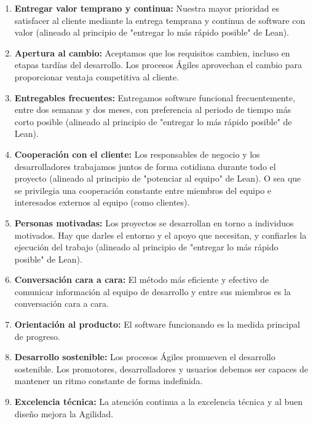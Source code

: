 \begin{enumerate}

\item \textbf{Entregar valor temprano y continua:} Nuestra mayor prioridad es satisfacer al cliente mediante la entrega temprana y continua de software con valor (alineado al principio de "entregar lo más rápido posible" de Lean).

\item \textbf{Apertura al cambio:} Aceptamos que los requisitos cambien, incluso en etapas tardías del desarrollo. Los procesos Ágiles aprovechan el cambio para proporcionar ventaja competitiva al cliente.

\item \textbf{Entregables frecuentes:} Entregamos software funcional frecuentemente, entre dos semanas y dos meses, con preferencia al periodo de tiempo más corto posible (alineado al principio de "entregar lo más rápido posible" de Lean).

\item \textbf{Cooperación con el cliente:} Los responsables de negocio y los desarrolladores trabajamos juntos de forma cotidiana durante todo el proyecto (alineado al principio de "potenciar al equipo" de Lean). O sea que se privilegia una cooperación constante entre miembros del equipo e interesados externos al equipo (como clientes).

\item \textbf{Personas motivadas:} Los proyectos se desarrollan en torno a individuos motivados. Hay que darles el entorno y el apoyo que necesitan, y confiarles la ejecución del trabajo (alineado al principio de "entregar lo más rápido posible" de Lean).

\item \textbf{Conversación cara a cara:} El método más eficiente y efectivo de comunicar información al equipo de desarrollo y entre sus miembros es la conversación cara a cara.

\item \textbf{Orientación al producto:} El software funcionando es la medida principal de progreso.

\item \textbf{Desarrollo sostenible:} Los procesos Ágiles promueven el desarrollo sostenible. Los promotores, desarrolladores y usuarios debemos ser capaces de mantener un ritmo constante de forma indefinida.

\item \textbf{Excelencia técnica:} La atención continua a la excelencia técnica y al buen diseño mejora la Agilidad.


\end{enumerate}
